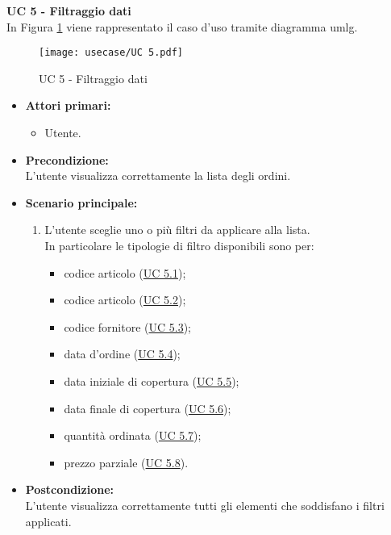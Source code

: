 \noindent \textbf{\large UC 5 - Filtraggio dati}\\[0.2cm]
\label{uc:filtraggio-dati}
\noindent In Figura \ref{use-case-5} viene rappresentato il caso d'uso tramite diagramma \gls{umlg}.
\begin{figure}[!h] 
    \centering 
    \texttt{[image: usecase/UC 5.pdf]} 
    \caption{UC 5 - Filtraggio dati}
	\label{use-case-5}
\end{figure}
\begin{itemize}

	\item \textbf{Attori primari: }
		\begin{itemize}
			\item Utente.
		\end{itemize}

	\item \textbf{Precondizione: }\\[0.3cm]
		L'utente visualizza correttamente la lista degli ordini.

	\item \textbf{Scenario principale: }
		\begin{enumerate}
			\item L'utente sceglie uno o più filtri da applicare alla lista.\\
			In particolare le tipologie di filtro disponibili sono per:
			\begin{itemize}
				\item codice articolo (\hyperref[uc:filtraggio-codice-articolo]{UC 5.1});
				\item codice articolo (\hyperref[uc:filtraggio-codice-articolo]{UC 5.2});
				\item codice fornitore (\hyperref[uc:filtraggio-codice-fornitore]{UC 5.3});
				\item data d'ordine (\hyperref[uc:filtraggio-data-ordine]{UC 5.4});
				\item data iniziale di copertura (\hyperref[uc:filtraggio-data-iniziale-copertura]{UC 5.5});
				\item data finale di copertura (\hyperref[uc:filtraggio-data-finale-copertura]{UC 5.6});
				\item quantità ordinata (\hyperref[uc:filtraggio-quantita-ordinata]{UC 5.7});
				\item prezzo parziale (\hyperref[uc:filtraggio-prezzo-parziale-ord]{UC 5.8}).
			\end{itemize}
		\end{enumerate}
		

	\item \textbf{Postcondizione: }\\[0.3cm]
		L'utente visualizza correttamente tutti gli elementi che soddisfano i filtri applicati.

\end{itemize}

